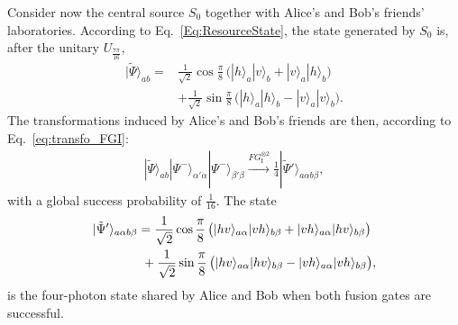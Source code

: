 \documentclass[aps,floatfix,superscriptaddress,twocolumn,tightenlines,amsmath,amssymb,nofootinbib,10pt]{revtex4-1}
\newcommand{\ket}[1] {| #1 \rangle}
\begin{document}
Consider now the central source $S_0$ together with Alice's and Bob's friends' laboratories.
According to Eq.~\eqref{Eq:ResourceState}, the state generated by $S_0$ is, after the unitary $U_{\frac{7\pi}{16}}$,
\begin{align}
\ket{\tilde\Psi}_{ab} = & \frac{1}{\sqrt{2}} \cos \frac{\pi}{8} \, \big(\ket{h}_a\ket{v}_b+\ket{v}_a\ket{h}_b\big) \nonumber\\
& + \frac{1}{\sqrt{2}} \sin \frac{\pi}{8} \, \big(\ket{h}_a\ket{h}_b-\ket{v}_a\ket{v}_b\big).
\end{align}
The transformations induced by Alice's and Bob's friends are then, according to Eq.~\eqref{eq:transfo_FGI}:
\begin{align}
\ket{\tilde\Psi}_{ab}\ket{\Psi^-}_{\alpha'\alpha}\ket{\Psi^-}_{\beta'\beta} \xrightarrow{FG_\text{I}^{\otimes 2}} \frac14 \ket{\tilde \Psi'}_{a \alpha b \beta}, \label{eq:4photon_state_transfo}
\end{align}
with a global success probability of $\frac{1}{16}$. The state
\begin{align}
\ket{\tilde \Psi'}_{a \alpha b \beta} 
& = \frac{1}{\sqrt{2}} \cos \frac{\pi}{8} \, \big(\ket{hv}_{a \alpha}\ket{vh}_{b \beta}+ \ket{vh}_{a \alpha}\ket{hv}_{b \beta}\big) \notag \\
& \ + \frac{1}{\sqrt{2}} \sin \frac{\pi}{8} \, \big( \ket{hv}_{a \alpha} \ket{hv}_{b \beta}-\ket{vh}_{a \alpha} \ket{vh}_{b \beta}\big), 
\label{eq:4photon_state}
\end{align}
is the four-photon state shared by Alice and Bob when both fusion gates are successful.
\end{document}
